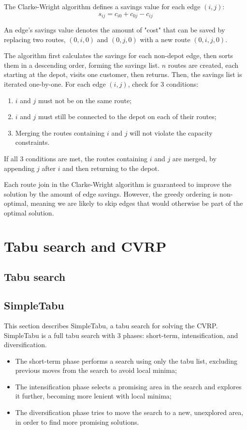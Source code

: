 \documentclass[12pt]{report}
\begin{document}
The Clarke-Wright algorithm defines a savings value for each edge $(i,j)$:
\[
	s_{ij} = c_{i0} + c_{0j} - c_{ij}
\]

An edge's savings value denotes the amount of "cost" that can be saved by replacing two routes, $(0, i, 0)$ and $(0, j, 0)$ with a new route $(0, i, j, 0)$.

The algorithm first calculates the savings for each non-depot edge, then sorts them in a descending order, forming the savings list. $n$ routes are created, each starting at the depot, visits one customer, then returns. Then, the savings list is iterated one-by-one. For each edge $(i, j)$, check for 3 conditions:
\begin{enumerate}
	\item $i$ and $j$ must not be on the same route;
	\item $i$ and $j$ must still be connected to the depot on each of their routes;
	\item Merging the routes containing $i$ and $j$ will not violate the capacity constraints.
\end{enumerate}

If all 3 conditions are met, the routes containing $i$ and $j$ are merged, by appending $j$ after $i$ and then returning to the depot.

Each route join in the Clarke-Wright algorithm is guaranteed to improve the solution by the amount of edge savings. However, the greedy ordering is non-optimal, meaning we are likely to skip edges that would otherwise be part of the optimal solution.

\chapter{Tabu search and CVRP}
\section{Tabu search}

\section{SimpleTabu}
This section describes SimpleTabu, a tabu search for solving the CVRP. SimpleTabu is a full tabu search with 3 phases: short-term, intensification, and diversification.

\begin{itemize}
	\item The short-term phase performs a search using only the tabu list, excluding previous moves from the search to avoid local minima;
	\item The intensification phase selects a promising area in the search and explores it further, becoming more lenient with local minima;
	\item The diversification phase tries to move the search to a new, unexplored area, in order to find more promising solutions.
\end{itemize}
\end{document}
